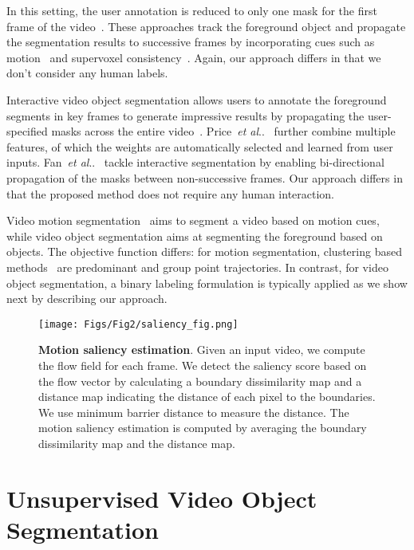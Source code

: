 \documentclass[runningheads]{llncs}
\makeatletter
\def\@onedot{\ifx\@let@token.\else.\null\fi\xspace}
\DeclareRobustCommand\onedot{\futurelet\@let@token\@onedot}
\def\etal{\emph{et al}\onedot}
\newcommand{\tb}[1]{\textbf{#1}}
\makeatother
\begin{document}
In this setting, the user annotation is reduced to only one mask for the first frame of the video~\cite{BrendelICCV09,GrundmannCVPR2010,TsaiBMVC2010,JainECCV14,TsaiCVPR2016,MaerkiCVPR16,PerazziCVPR2017}. These approaches track the foreground object and propagate the segmentation results to successive frames by incorporating cues such as motion~\cite{TsaiBMVC2010,TsaiCVPR2016} and supervoxel consistency~\cite{JainECCV14}. Again, our approach differs in that we don't consider any human labels.

Interactive video object segmentation allows users to annotate the foreground segments in key frames to generate impressive results by propagating the user-specified masks across the entire video~\cite{PriceICCV09,FanTOG15,NagarajaICCV15,LiTOG16,JainECCV14}. Price~\etal~\cite{PriceICCV09} further combine multiple features, of which the weights are automatically selected and learned from user inputs. Fan~\etal~\cite{FanTOG15} tackle interactive segmentation by enabling bi-directional propagation of the masks between non-successive frames. Our approach differs in that the proposed method does not require any human interaction.


Video motion segmentation~\cite{BroxECCV2010} aims to segment a video based on motion cues, while video object segmentation aims at segmenting the foreground based on objects. The objective function differs: for motion segmentation, clustering based methods~\cite{BroxECCV2010,OchsPAMI2014,KeuperICCV15,LezamaCVPR11} are predominant and group point trajectories. In contrast, for video object segmentation, a binary labeling formulation is typically applied as we show next by describing our approach. 
 \begin{figure*}[t]
\centering
\texttt{[image: Figs/Fig2/saliency\_fig.png]}\\
\caption{{\tb{Motion saliency estimation}}. Given an input video, we compute the flow field for each frame. We detect the saliency score based on the flow vector by calculating a boundary dissimilarity map  and a distance map  indicating the distance of each pixel to the boundaries. We use minimum barrier distance to measure the distance. The motion saliency estimation is computed by averaging the boundary dissimilarity map and the distance map.}
\label{fig:init}
\end{figure*} \section{Unsupervised Video Object Segmentation}
\label{sec:method}
\end{document}
